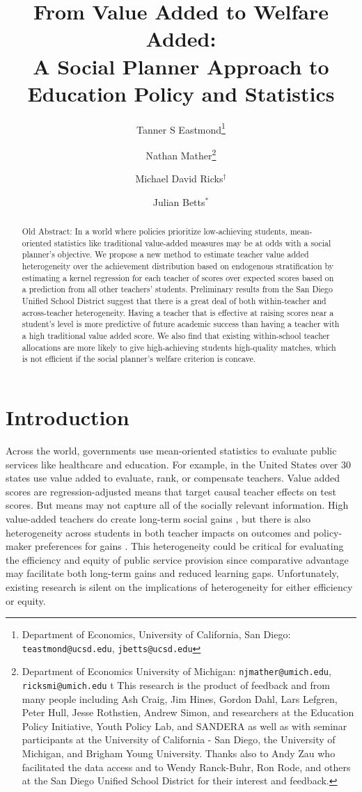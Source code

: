 \documentclass{article}
\title{From Value Added to Welfare Added: \\ A Social Planner Approach to Education Policy and Statistics}
\author{Tanner S Eastmond\thanks{Department of Economics, University of California, San Diego: \texttt{teastmond@ucsd.edu}, \texttt{jbetts@ucsd.edu}} \and Nathan Mather\thanks{Department of Economics University of Michigan: \texttt{njmather@umich.edu}, \texttt{ricksmi@umich.edu} \hspace{11em} {\color{white}t} This research is the product of feedback and from many people including Ash Craig, Jim Hines, Gordon Dahl, Lars Lefgren, Peter Hull, Jesse Rothstien,  Andrew Simon, and  researchers at the Education Policy Initiative, Youth Policy Lab, and SANDERA as well as with seminar participants at the University of California - San Diego, the University of Michigan, and Brigham Young University. Thanks also to Andy Zau who facilitated the data access and to  Wendy Ranck-Buhr, Ron Rode, and others at the San Diego Unified School District for their interest and feedback.} \and Michael David Ricks$^\dagger$ \and Julian Betts$^*$}
\date{\parbox{\linewidth}{\centering%
  This Draft Updated: \today\endgraf
  }}
\theoremstyle{definition}
\theoremstyle{definition}
\theoremstyle{definition}
\begin{document}
\maketitle

\onehalfspacing
\begin{abstract}
{\color{red}Old Abstract:} In a world where policies prioritize low-achieving students, mean-oriented statistics like traditional value-added measures may be at odds with a social planner’s objective. We propose a new method to estimate teacher value added heterogeneity over the achievement distribution based on endogenous stratification by estimating a kernel regression for each teacher of scores over expected scores based on a prediction from all other teachers’ students.  Preliminary results from the San Diego Unified School District suggest that there is a great deal of both within-teacher and across-teacher heterogeneity. Having a teacher that is effective at raising scores near a student’s level is more predictive of future academic success than having a teacher with a high traditional value added score. We also find that existing within-school teacher allocations are more likely to give high-achieving students high-quality matches, which is not efficient if the social planner’s welfare criterion is concave.


\end{abstract}


\doublespacing
\vfill
\pagebreak

\section{Introduction}

Across the world, governments use mean-oriented statistics to evaluate public services like healthcare and education. For example, in the United States over 30 states use value added to evaluate, rank, or compensate teachers.
Value added scores are regression-adjusted means that target causal teacher effects on test scores. But means may not capture all of the socially relevant information. High value-added teachers do create long-term social gains \citep[e.g.,][]{chetty2014measuring2,pope2017multidimensional}, but there is also heterogeneity across students in both teacher impacts on outcomes \citep[as in][etc.]{Delgado2020,bates2022teacher} and policy-maker preferences for gains \citep[such as No Child Left Behind, see][]{a}. This heterogeneity could be critical for evaluating the efficiency and equity of public service provision since comparative advantage may facilitate both long-term gains and reduced learning gaps. Unfortunately, existing research is silent on the implications of heterogeneity for either efficiency or equity.
\end{document}
